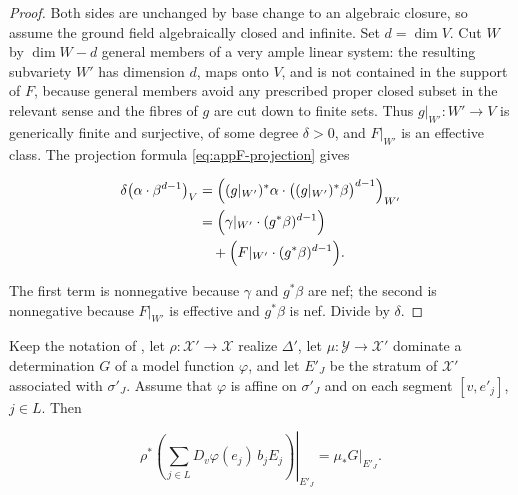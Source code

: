 \begin{proof}
Both sides are unchanged by base change to an algebraic closure, so assume
the ground field algebraically closed and infinite.  Set $d=\dim V$.  Cut
$W$ by $\dim W-d$ general members of a very ample linear system: the
resulting subvariety $W'$ has dimension $d$, maps onto $V$, and is not
contained in the support of $F$, because general members avoid any
prescribed proper closed subset in the relevant sense and the fibres of
$g$ are cut down to finite sets.  Thus $g|_{W'}:W'\to V$ is generically
finite and surjective, of some degree $\delta>0$, and $F|_{W'}$ is an
effective class.  The projection formula
\eqref{eq:appF-projection} gives

\[
 \begin{aligned}
 \delta\bigl(\alpha\cdot\beta^{d-1}\bigr)_V
 &=\Bigl((g|_{W'})^*\alpha\cdot
    \bigl((g|_{W'})^*\beta\bigr)^{d-1}\Bigr)_{W'}\\
 &=\Bigl(\gamma|_{W'}\cdot(g^*\beta)^{d-1}\Bigr)\\
 &\quad+\Bigl(F|_{W'}\cdot(g^*\beta)^{d-1}\Bigr).
 \end{aligned}
\]

The first term is nonnegative because $\gamma$ and $g^*\beta$ are nef;
the second is nonnegative because $F|_{W'}$ is effective and
$g^*\beta$ is nef.  Divide by $\delta$.
\end{proof}

\begin{lemma}
\label{lem:ch22-restriction-identity}
Keep the notation of , let
$\rho:\mathcal X'\to\mathcal X$ realize $\Delta'$, let
$\mu:\mathcal Y\to\mathcal X'$ dominate a determination $G$ of a model
function $\varphi$, and let $E'_J$ be the stratum of $\mathcal X'$
associated with $\sigma'_J$.  Assume that $\varphi$ is affine on
$\sigma'_J$ and on each segment $[v,e'_j]$, $j\in L$.  Then

\[
 \left.
 \rho^*\!\left(\sum_{j\in L}D_v\varphi(e_j)\,b_jE_j\right)
 \right|_{E'_J}
       =\left.\mu_*G\right|_{E'_J}.
\tag{22.40}\label{eq:ch22-slope-divisor-identity}
\]
\end{lemma}

